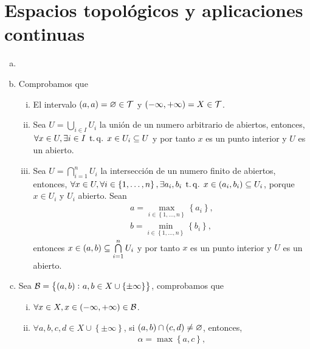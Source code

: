\chapter{Espacios topológicos y aplicaciones continuas}

\begin{eje}
    \begin{enumerate}[(a)]
        \item[]
        \item Comprobamos que
            \begin{enumerate}[i)]
                \item El intervalo $\left( a, a \right) = \varnothing \in \mathcal{T}$ y $\left( -\infty, +\infty \right) = X \in \mathcal{T}$.
                \item Sea $U = \bigcup\limits_{i \in I} U_i$ la unión de un numero arbitrario de abiertos, entonces, $\forall x \in U, \exists i \in I \operatorname{\;t.q.\;} x \in U_i \subseteq U$ y por tanto $x$ es un punto interior y $U$ es un abierto.
                \item Sea $U = \bigcap\limits_{i = 1}^n U_i$ la intersección de un numero finito de abiertos, entonces, $\forall x \in U, \forall i \in \left\{ 1, \dots, n \right\}, \exists a_i, b_i \operatorname{\;t.q.\;} x \in \left(a_i, b_i\right) \subseteq U_i$, porque $x \in U_i$ y $U_i$ abierto. Sean
                    \begin{gather*}
                        a = \max_{i \in \left\{ 1, \dots, n \right\}} \left\{a_i\right\}, \\
                        b = \min_{i \in \left\{ 1, \dots, n \right\}} \left\{b_i\right\},
                    \end{gather*}
                entonces $x \in \left( a, b \right) \subseteq \bigcap\limits_{i = 1}^n U_i$ y por tanto $x$ es un punto interior y $U$ es un abierto.
            \end{enumerate}
        \item Sea $\mathcal{B} = \left\{ \left( a, b \right) \colon a, b \in X \cup \left\{ \pm \infty \right\} \right\}$, comprobamos que
            \begin{enumerate}[i)]
                \item $\forall x \in X, x \in \left( -\infty, +\infty \right) \in \mathcal{B}$.
                \item $\forall a, b, c, d \in X \cup \left\{ \pm \infty \right\}$, si $\left( a, b \right) \cap \left( c, d \right) \neq \varnothing$, entonces,
                    \begin{gather*}
                        \alpha = \max \left\{ a, c \right\}, \\

\end{gather*}
\end{enumerate}
\end{enumerate}
\end{eje}
